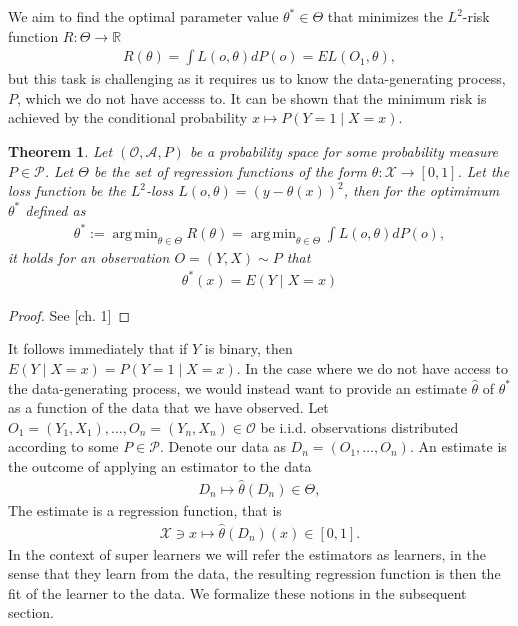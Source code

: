 \documentclass[11pt, a4paper]{article}
\DeclareMathOperator*{\argmin}{arg\,min}
\newtheorem{theorem}{Theorem}
\theoremstyle{definition}
\theoremstyle{remark}
\begin{document}
We aim to find the optimal parameter value $\theta^* \in \Theta$ that minimizes the $L^2$-risk function $R: \Theta \to \mathbb{R}$
\begin{align*}
    R(\theta) = \int L(o, \theta)  dP(o) = EL(O_1, \theta),
\end{align*}
but this task is challenging as it requires us to know the data-generating process, $ P $, which we do not have accesss to. It can be shown that the minimum risk is achieved by the conditional probability $ x \mapsto P(Y = 1\mid X = x) $. 
\begin{theorem}
    Let $ (\mathcal{O} , \mathcal{A}, P) $ be a probability space for some probability measure $ P \in \mathcal{P} $. Let $ \Theta $ be the set of regression functions of the form $ \theta : \mathcal{X} \to [0,1] $. Let the loss function be the $ L^2 $-loss $ L(o, \theta) = (y - \theta(x))^2 $, then for the optimimum $ \theta^* $ defined as 
    \begin{align*}
        \theta^* := \argmin_{\theta \in \Theta} R(\theta)= \argmin_{\theta \in \Theta} \int L(o, \theta)  dP(o),
    \end{align*}
    it holds for an observation $ O = (Y, X) \sim P $ that
    \begin{align*}
        \theta^{*}(x) = E(Y \mid X = x) 
    \end{align*}
\end{theorem}
\begin{proof}
    See \cite{gyorfi2002distribution}[ch. 1]
\end{proof}
It follows immediately that if $ Y $ is binary, then $ E(Y \mid X = x) = P(Y = 1 \mid X = x) $.  
In the case where we do not have access to the data-generating process, we would instead want to provide an estimate $ \hat{\theta} $ of $ \theta^*$ as a function of the data that we have observed. Let $ O_1 = (Y_1 , X_1) ,\ldots, O_n = (Y_n , X_n) \in  \mathcal{O} $ be i.i.d. observations distributed according to some $ P \in \mathcal{P} $. Denote our data as $ D_n = (O_1, \dots , O_n)$. An estimate is the outcome of applying an estimator to the data 
\begin{align*}
    D_n \mapsto \hat{\theta}(D_n) \in \Theta,   
\end{align*}
The estimate is a regression function, that is 
\begin{align*}
    \mathcal{X} \ni x \mapsto \hat{\theta}(D_n)(x) \in [0,1].
\end{align*}
In the context of super learners we will refer the estimators as learners, in the sense that they learn from the data, the resulting regression function is then the fit of the learner to the data. We formalize these notions in the subsequent section. 
\end{document}
